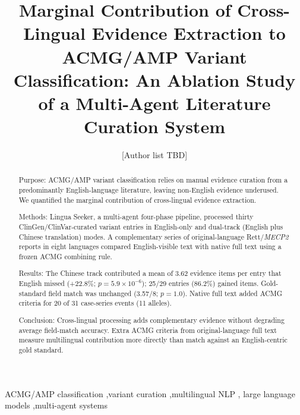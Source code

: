 \documentclass[preprint,12pt]{elsarticle}
\begin{document}
\begin{frontmatter}

\title{Marginal Contribution of Cross-Lingual Evidence Extraction to
ACMG/AMP Variant Classification: An Ablation Study of a Multi-Agent
Literature Curation System}

\author[aff1]{[Author list TBD]}
\address[aff1]{[Affiliation TBD]}

\begin{abstract}
Purpose: ACMG/AMP variant classification relies on manual
evidence curation from a predominantly English-language literature,
leaving non-English evidence underused. We quantified the marginal
contribution of cross-lingual evidence extraction.

Methods: Lingua Seeker, a multi-agent four-phase pipeline, processed
thirty ClinGen/ClinVar-curated variant entries in English-only and
dual-track (English plus Chinese translation) modes. A complementary
series of original-language Rett/\textit{MECP2} reports in eight
languages compared English-visible text with native full text using a
frozen ACMG combining rule.

Results: The Chinese track contributed a mean of 3.62 evidence
items per entry that English missed (+22.8\%; $p = 5.9 \times 10^{-6}$);
25/29 entries (86.2\%) gained items. Gold-standard field match was
unchanged (3.57/8; $p = 1.0$). Native full text added ACMG criteria for
20 of 31 case-series events (11 alleles).

Conclusion: Cross-lingual processing adds complementary evidence
without degrading average field-match accuracy. Extra ACMG criteria from
original-language full text measure multilingual contribution more
directly than match against an English-centric gold standard.
\end{abstract}

\begin{keyword}
ACMG/AMP classification \sep variant curation \sep multilingual NLP \sep
large language models \sep multi-agent systems
\end{keyword}

\end{frontmatter}
\end{document}
